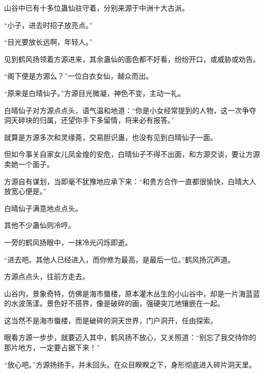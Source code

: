 \begin{this_body}
山谷中已有十多位蛊仙驻守着，分别来源于中洲十大古派。

“小子，进去时招子放亮点。”

“目光要放长远啊，年轻人。”

见到鹤风扬领着方源进来，其余蛊仙的面色都不好看，纷纷开口，或威胁或劝告。

“阁下便是方源么？”一位白衣女仙，越众而出。

“原来是白晴仙子。”方源目光微凝，神色不变，主动一礼。

白晴仙子对方源点点头，语气温和地道：“你是小女经常提到的人物，这一次争夺洞天碎块的归属，还望你手下多留情，将来必有报答。”

就算是方源多次和灵缘斋，交易胆识蛊，也没有见到白晴仙子一面。

但如今事关自家女儿凤金煌的安危，白晴仙子不得不出面，和方源交谈，要让方源卖她一个面子。

方源自有谋划，当即毫不犹豫地应承下来：“和贵方合作一直都很愉快，白晴大人放宽心便是。”

白晴仙子满意地点点头。

其他不少蛊仙则冷哼。

一旁的鹤风扬眼中，一抹冷光闪烁即逝。

“进去吧。其他人已经进入，而你修为最高，是最后一位。”鹤风扬沉声道。

方源点点头，往前方走去。

山谷内，景象奇特，仿佛是海市蜃楼，原本灌木丛生的小山谷中，却是一片海蓝蓝的水波荡漾。景色好不搭界，像是破碎的画，强硬突兀地镶嵌在一起。

这当然不是海市蜃楼，而是破碎的洞天世界，门户洞开，任由探索。

眼看方源一步步，就要迈入其中，鹤风扬不放心，又关照道：“别忘了我交待你的那片地方，一定要占据下来！”

“放心吧。”方源扬扬手，并未回头。在众目睽睽之下，身形彻底进入碎片洞天里。

\end{this_body}

